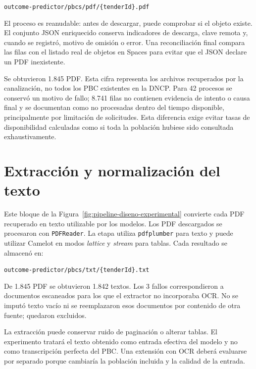 \begin{center}
\texttt{outcome-predictor/pbcs/pdf/\{tenderId\}.pdf}
\end{center}

El proceso es reanudable: antes de descargar, puede comprobar si el objeto existe. El conjunto JSON enriquecido conserva indicadores de descarga, clave remota y, cuando se registró, motivo de omisión o error. Una reconciliación final compara las filas con el listado real de objetos en Spaces para evitar que el JSON declare un PDF inexistente.

Se obtuvieron 1.845 PDF. Esta cifra representa los archivos recuperados por la canalización, no todos los PBC existentes en la DNCP. Para 42 procesos se conservó un motivo de fallo; 8.741 filas no contienen evidencia de intento o causa final y se documentan como no procesadas dentro del tiempo disponible, principalmente por limitación de solicitudes. Esta diferencia exige evitar tasas de disponibilidad calculadas como si toda la población hubiese sido consultada exhaustivamente.

\section{Extracción y normalización del texto}
\label{sec:extraccion_texto}

Este bloque de la Figura~\ref{fig:pipeline-diseno-experimental} convierte cada PDF recuperado en texto utilizable por los modelos. Los PDF descargados se procesaron con \texttt{PDFReader}. La etapa utiliza \texttt{pdfplumber} para texto y puede utilizar Camelot en modos \textit{lattice} y \textit{stream} para tablas. Cada resultado se almacenó en:

\begin{center}
\texttt{outcome-predictor/pbcs/txt/\{tenderId\}.txt}
\end{center}

De 1.845 PDF se obtuvieron 1.842 textos. Los 3 fallos correspondieron a documentos escaneados para los que el extractor no incorporaba OCR. No se imputó texto vacío ni se reemplazaron esos documentos por contenido de otra fuente; quedaron excluidos.

La extracción puede conservar ruido de paginación o alterar tablas. El experimento tratará el texto obtenido como entrada efectiva del modelo y no como transcripción perfecta del PBC. Una extensión con OCR deberá evaluarse por separado porque cambiaría la población incluida y la calidad de la entrada.

